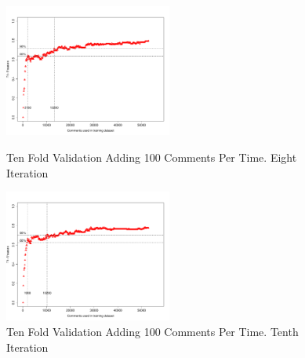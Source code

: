 \begin{figure}[thb!]
  \centering
  \vspace{-93mm}
  \includegraphics[width=0.49\textwidth]{figures/appendix/ten_fold_validation_requirement/ten_fold_validation_7_100.pdf}
  \vspace{-5mm}
  \caption{Ten Fold Validation Adding 100 Comments Per Time. Eight Iteration}
  \label{fig:requirement_ten_fold_validation_7_100}
  \includegraphics[width=0.49\textwidth]{figures/appendix/ten_fold_validation_requirement/ten_fold_validation_9_100.pdf}
  \vspace{-5mm}
  \caption{Ten Fold Validation Adding 100 Comments Per Time. Tenth Iteration}
  \label{fig:requirement_ten_fold_validation_9_100}
  
\end{figure}

